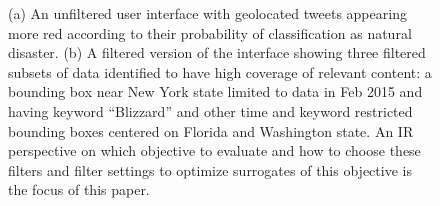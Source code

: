 \begin{figure}[t]
\begin{centering}
\par\end{centering}
\caption{(a) An unfiltered user interface with geolocated tweets appearing more red according to their probability of classification as natural disaster.  (b) A filtered version of the interface showing three filtered subsets of data identified to have high coverage of relevant content: a bounding box near New York state limited to data in Feb 2015 and having keyword ``Blizzard'' and other time and keyword restricted bounding boxes centered on Florida and Washington state.  An IR perspective on which objective to evaluate and how to choose these filters and filter settings to optimize surrogates of this objective is the focus of this paper.}
\label{Fig:UseCase}
\end{figure}


